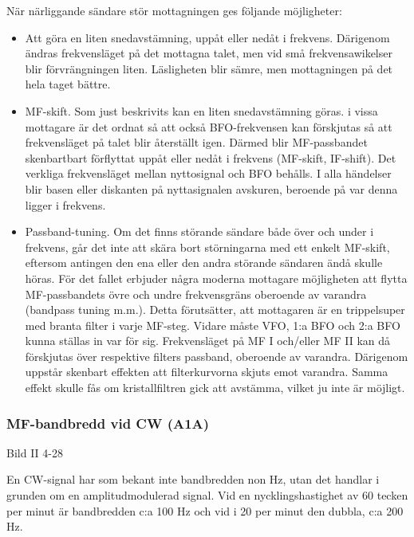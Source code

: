 När närliggande sändare stör mottagningen ges följande möjligheter:
\begin{itemize}
  \item Att göra en liten snedavstämning, uppåt eller nedåt i
    frekvens. Därigenom ändras frekvensläget på det mottagna talet,
    men vid små frekvensawikelser blir förvrängningen
    liten. Läsligheten blir sämre, men mottagningen på det hela taget
    bättre.

  \item MF-skift. Som just beskrivits kan en liten snedavstämning
    göras. i vissa mottagare är det ordnat så att också BFO-frekvensen
    kan förskjutas så att frekvensläget på talet blir återställt
    igen. Därmed blir MF-passbandet skenbartbart förflyttat uppåt
    eller nedåt i frekvens (MF-skift, IF-shift).  Det verkliga
    frekvensläget mellan nyttosignal och BFO behålls. I alla händelser
    blir basen eller diskanten på nyttasignalen avskuren, beroende på
    var denna ligger i frekvens.

  \item Passband-tuning. Om det finns störande sändare både över och
    under i frekvens, går det inte att skära bort störningarna med ett
    enkelt MF-skift, eftersom antingen den ena eller den andra
    störande sändaren ändå skulle höras. För det fallet erbjuder några
    moderna mottagare möjligheten att flytta MF-passbandets övre och
    undre frekvensgräns oberoende av varandra (bandpass tuning
    m.m.). Detta förutsätter, att mottagaren är en trippelsuper med
    branta filter i varje MF-steg.  Vidare måste VFO, 1:a BFO och 2:a
    BFO kunna ställas in var för sig. Frekvensläget på MF I och/eller
    MF II kan då förskjutas över respektive filters passband,
    oberoende av varandra. Därigenom uppstår skenbart effekten att
    filterkurvorna skjuts emot varandra. Samma effekt skulle fås om
    kristallfiltren gick att avstämma, vilket ju inte är möjligt.
\end{itemize}

\subsubsection{MF-bandbredd vid  CW (A1A)}

Bild II 4-28

En CW-signal har som bekant inte bandbredden non Hz, utan det handlar
i grunden om en amplitudmodulerad signal. Vid en nycklingshastighet av
60 tecken per minut är bandbredden c:a 100 Hz och vid i 20 per minut
den dubbla, c:a 200 Hz.

